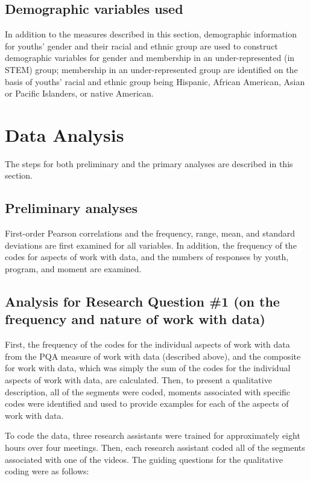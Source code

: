 \documentclass[]{msu-thesis}
\theoremstyle{definition}
\theoremstyle{definition}
\theoremstyle{definition}
\theoremstyle{remark}
\begin{document}
\subsection{Demographic variables
used}\label{demographic-variables-used}

In addition to the measures described in this section, demographic
information for youths' gender and their racial and ethnic group are
used to construct demographic variables for gender and membership in an
under-represented (in STEM) group; membership in an under-represented
group are identified on the basis of youths' racial and ethnic group
being Hispanic, African American, Asian or Pacific Islanders, or native
American.

\section{Data Analysis}\label{data-analysis}

The steps for both preliminary and the primary analyses are described in
this section.

\subsection{Preliminary analyses}\label{preliminary-analyses}

First-order Pearson correlations and the frequency, range, mean, and
standard deviations are first examined for all variables. In addition,
the frequency of the codes for aspects of work with data, and the
numbers of responses by youth, program, and moment are examined.

\subsection{Analysis for Research Question \#1 (on the frequency and
nature of work with
data)}\label{analysis-for-research-question-1-on-the-frequency-and-nature-of-work-with-data}

First, the frequency of the codes for the individual aspects of work
with data from the PQA measure of work with data (described above), and
the composite for work with data, which was simply the sum of the codes
for the individual aspects of work with data, are calculated. Then, to
present a qualitative description, all of the segments were coded,
moments associated with specific codes were identified and used to
provide examples for each of the aspects of work with data.

To code the data, three research assistants were trained for
approximately eight hours over four meetings. Then, each research
assistant coded all of the segments associated with one of the videos.
The guiding questions for the qualitative coding were as follows:
\end{document}
